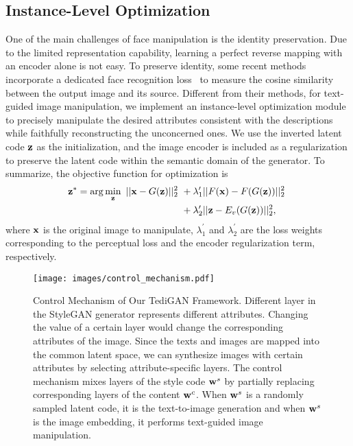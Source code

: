 \documentclass[final]{cvpr}
\newcommand{\w}{{\rm\bf w}}
\newcommand{\x}{{\rm\bf x}}
\newcommand{\z}{{\rm\bf z}}
\begin{document}
\subsection{Instance-Level Optimization}
\label{subsec:instance-level-optimization}
One of the main challenges of face manipulation is the identity preservation. Due to the limited representation capability, learning a perfect reverse mapping with an encoder alone is not easy. 
To preserve identity, some recent methods~\cite{ververas2020slidergan,richardson2020encoding} incorporate a dedicated face recognition loss~\cite{deng2019arcface} to measure the cosine similarity between the output image and its source.
Different from their methods, for text-guided image manipulation, we implement an instance-level optimization module to precisely manipulate the desired attributes consistent with the descriptions while faithfully reconstructing the unconcerned ones.  
We use the inverted latent code $\z$ as the initialization, and the image encoder is included as a regularization to preserve the latent code within the semantic domain of the generator. 
To summarize, the objective function for optimization is
\begin{align}
  \begin{aligned}
    \z^{*} = \arg\min_{\z}\ ||\x - G(\z)||_2^2\ &+ \lambda_{1}^{\prime}||F(\x) - F(G(\z))||_2^2\ \\
    &+ \lambda_{2}^{\prime}||\z - E_v(G(\z))||_2^2,
  \end{aligned} \label{eq:optimization}
\end{align}
where $\x$ is the original image to manipulate, $\lambda_{1}^{\prime}$ and $\lambda_{2}^{\prime}$ are the loss weights corresponding to the perceptual loss and the encoder regularization term, respectively.

\begin{figure}[t]
\centering
\texttt{[image: images/control\_mechanism.pdf]}
\caption{Control Mechanism of Our TediGAN Framework.
Different layer in the StyleGAN generator represents different attributes. 
Changing the value of a certain layer would change the corresponding attributes of the image.
Since the texts and images are mapped into the common latent space, we can synthesize images with certain attributes by selecting attribute-specific layers.
The control mechanism mixes layers of the style code $\w^s$ by partially replacing corresponding layers of the content $\w^c$.
When $\w^s$ is a randomly sampled latent code, it is the text-to-image generation and when $\w^s$ is the image embedding, it performs text-guided image manipulation. 
}
\label{fig:control_mechanism}
\end{figure}
\end{document}
